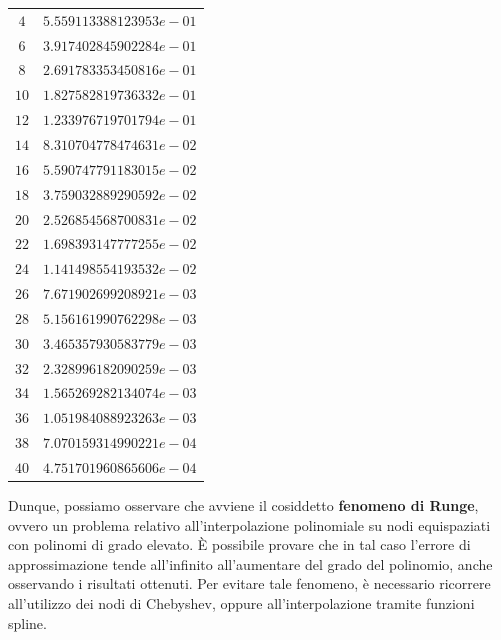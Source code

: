 \begin{table}[H]
\begin{minipage}{0.5\textwidth}
\begin{tabular}{|c|c|}
			$4$  & $5.559113388123953e-01$ \\ 
			$6$  & $3.917402845902284e-01$ \\ 
			$8$  & $2.691783353450816e-01$ \\ 
			$10$ & $1.827582819736332e-01$ \\ 
			$12$ & $1.233976719701794e-01$ \\ 
			$14$ & $8.310704778474631e-02$ \\ 
			$16$ & $5.590747791183015e-02$ \\ 
			$18$ & $3.759032889290592e-02$ \\ 
			$20$ & $2.526854568700831e-02$ \\ 
			$22$ & $1.698393147777255e-02$ \\ 
			$24$ & $1.141498554193532e-02$ \\ 
			$26$ & $7.671902699208921e-03$ \\ 
			$28$ & $5.156161990762298e-03$ \\ 
			$30$ & $3.465357930583779e-03$ \\ 
			$32$ & $2.328996182090259e-03$ \\ 
			$34$ & $1.565269282134074e-03$ \\ 
			$36$ & $1.051984088923263e-03$ \\ 
			$38$ & $7.070159314990221e-04$ \\ 
			$40$ & $4.751701960865606e-04$ \\ 
			\hline
		\end{tabular}
	\end{minipage}
\end{table}

Dunque, possiamo osservare che avviene il cosiddetto \textbf{fenomeno di Runge}, ovvero un problema relativo all'interpolazione polinomiale su nodi equispaziati con polinomi
di grado elevato. È possibile provare che in tal caso l'errore di approssimazione tende all'infinito all'aumentare del grado del polinomio, anche osservando i risultati ottenuti.
Per evitare tale fenomeno, è necessario ricorrere all'utilizzo dei nodi di Chebyshev, oppure all'interpolazione tramite funzioni spline.
